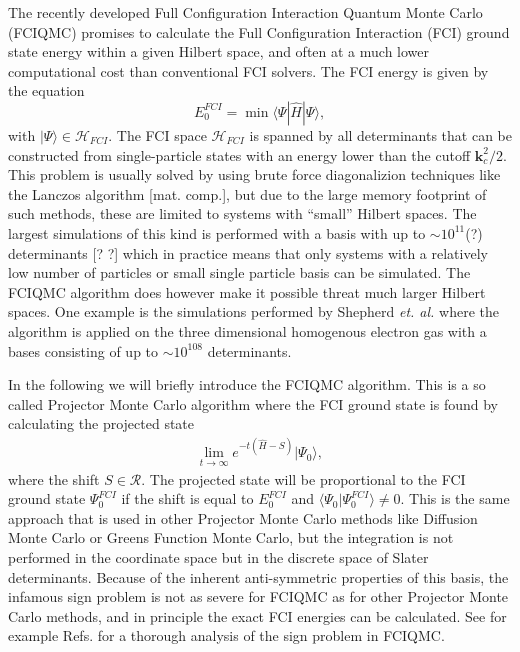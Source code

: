 \documentclass[aps,twocolumn,showpacs,floatfix,nofootinbib,preprintnumbers,superscriptaddress,amsmath,amssymb]{revtex4-1}
\newcommand{\expec}[1]{\langle #1 \rangle}
\begin{document}
The recently developed Full Configuration Interaction Quantum Monte
Carlo (FCIQMC) \cite{booth2009,cleland2010,shepherd2012a} promises to
calculate the Full Configuration Interaction (FCI) ground state energy
within a given Hilbert space, and often at a much lower computational
cost than conventional FCI solvers.
%
The FCI energy is given by the equation
\begin{equation}
	E_0^{FCI} = \min{\langle \Psi|\hat H|\Psi\rangle},
	\label{}
\end{equation}
with $|\Psi\rangle\in\mathcal H _{FCI}$. The FCI space $\mathcal H_{FCI}$ is spanned by all
determinants that can be constructed from single-particle states with
an energy lower than the cutoff $\mathbf{k}_c^2/2$.
%
This problem is usually solved by using brute force diagonalizion
techniques like the Lanczos algorithm [mat. comp.], but due to the
large memory footprint of such methods, these are limited to systems
with ``small'' Hilbert spaces. The largest simulations of this kind is
performed with a basis with up to $\sim 10^{11}$(?) determinants [? ?]
which in practice means that only systems with a relatively low number
of particles or small single particle basis can be simulated. The
FCIQMC algorithm does however make it possible threat much larger
Hilbert spaces. One example is the simulations performed by Shepherd
{\it et. al.} \cite{shepherd2012c} where the algorithm is applied on
the three dimensional homogenous electron gas with a bases consisting
of up to $\sim10^{108}$ determinants.

In the following we will briefly introduce the FCIQMC algorithm. 
This is a so called Projector Monte Carlo algorithm where the FCI ground state is found by calculating the projected state
\begin{align}
	\lim_{t\to\infty}e^{-t(\hat H-S)}|\Psi_0\rangle,
	\label{eq:projectedstate}
\end{align}
where the shift $S\in\mathcal R$. The projected state will be
proportional to the FCI ground state $\Psi_0^{FCI}$ if the shift is
equal to $E_0^{FCI}$ and $\expec{\Psi_0|\Psi_0^{FCI}}\neq 0$.  This is
the same approach that is used in other Projector Monte Carlo methods
like Diffusion Monte Carlo or Greens Function Monte Carlo, but the
integration is not performed in the coordinate space but in the
discrete space of Slater determinants. Because of the inherent
anti-symmetric properties of this basis, the infamous sign problem is
not as severe for FCIQMC as for other Projector Monte Carlo methods,
and in principle the exact FCI energies can be calculated. See for
example Refs. \cite{kolodrubetz2013,spencer2012} for a thorough
analysis of the sign problem in FCIQMC.
\end{document}

